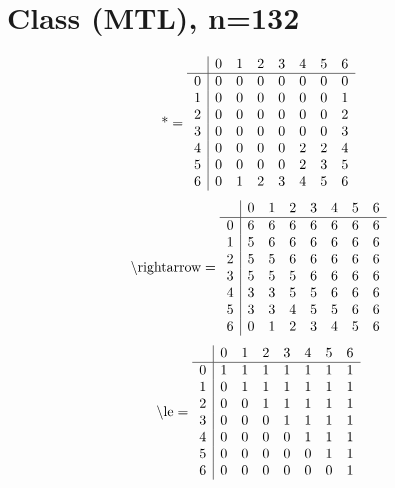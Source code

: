 \documentclass[11pt]{article}
\begin{document}
\section{Class (MTL), n=132}
\[\text{*} = 
\begin{array}{r | r r r r r r r}
 & 0 & 1 & 2 & 3 & 4 & 5 & 6 \\ \hline
0 & 0 & 0 & 0 & 0 & 0 & 0 & 0 \\
1 & 0 & 0 & 0 & 0 & 0 & 0 & 1 \\
2 & 0 & 0 & 0 & 0 & 0 & 0 & 2 \\
3 & 0 & 0 & 0 & 0 & 0 & 0 & 3 \\
4 & 0 & 0 & 0 & 0 & 2 & 2 & 4 \\
5 & 0 & 0 & 0 & 0 & 2 & 3 & 5 \\
6 & 0 & 1 & 2 & 3 & 4 & 5 & 6 \\
\end{array}
\]
\[\text{\textbackslash rightarrow} = 
\begin{array}{r | r r r r r r r}
 & 0 & 1 & 2 & 3 & 4 & 5 & 6 \\ \hline
0 & 6 & 6 & 6 & 6 & 6 & 6 & 6 \\
1 & 5 & 6 & 6 & 6 & 6 & 6 & 6 \\
2 & 5 & 5 & 6 & 6 & 6 & 6 & 6 \\
3 & 5 & 5 & 5 & 6 & 6 & 6 & 6 \\
4 & 3 & 3 & 5 & 5 & 6 & 6 & 6 \\
5 & 3 & 3 & 4 & 5 & 5 & 6 & 6 \\
6 & 0 & 1 & 2 & 3 & 4 & 5 & 6 \\
\end{array}
\]
\[\text{\textbackslash le} = 
\begin{array}{r | r r r r r r r}
 & 0 & 1 & 2 & 3 & 4 & 5 & 6 \\ \hline
0 & 1 & 1 & 1 & 1 & 1 & 1 & 1 \\
1 & 0 & 1 & 1 & 1 & 1 & 1 & 1 \\
2 & 0 & 0 & 1 & 1 & 1 & 1 & 1 \\
3 & 0 & 0 & 0 & 1 & 1 & 1 & 1 \\
4 & 0 & 0 & 0 & 0 & 1 & 1 & 1 \\
5 & 0 & 0 & 0 & 0 & 0 & 1 & 1 \\
6 & 0 & 0 & 0 & 0 & 0 & 0 & 1 \\
\end{array}
\]
\end{document}
